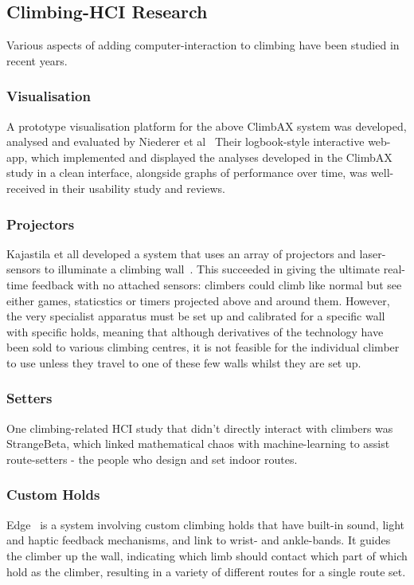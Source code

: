 \subsection{Climbing-HCI Research}
Various aspects of adding computer-interaction to climbing have been studied in recent years.

\subsubsection{Visualisation}
A prototype visualisation platform for the above ClimbAX system was developed, analysed and evaluated by Niederer et al~\cite{niederervis}
Their logbook-style interactive web-app, which implemented and displayed the analyses developed in the ClimbAX study in a clean interface, alongside graphs of performance over time, was well-received in their usability study and reviews.

\subsubsection{Projectors}
Kajastila et all developed a system that uses an array of projectors and laser-sensors to illuminate a climbing wall~\cite{projectedclimbwall}.
This succeeded in giving the ultimate real-time feedback with no attached sensors: climbers could climb like normal but see either games, staticstics or timers projected above and around them.
However, the very specialist apparatus must be set up and calibrated for a specific wall with specific holds, meaning that although derivatives of the technology have been sold to various climbing centres, it is not feasible for the individual climber to use unless they travel to one of these few walls whilst they are set up.

\subsubsection{Setters}
One climbing-related HCI study that didn't directly interact with climbers was StrangeBeta\cite{strangebeta}, which linked mathematical chaos with machine-learning to assist route-setters - the people who design and set indoor routes.


\subsubsection{Custom Holds}
Edge~\cite{edgeinteractive} is a system involving custom climbing holds that have built-in sound, light and haptic feedback mechanisms, and link to wrist- and ankle-bands.
It guides the climber up the wall, indicating which limb should contact which part of which hold as the climber, resulting in a variety of different routes for a single route set.




